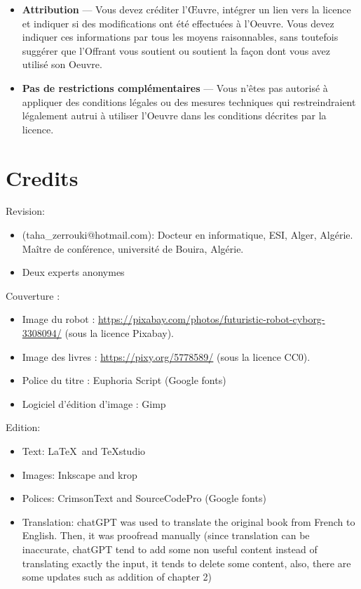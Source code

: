 \documentclass{KBook}
\begin{document}
\begin{tcolorbox}[colback=my-grey,
	colframe=my-grey,  
	center, arc=0pt,outer arc=0pt,
	valign=top, 
	halign=left,
	width=\textwidth]
	\begin{itemize}
		\item[] \textbf{Attribution} — Vous devez créditer l'Œuvre, intégrer un lien vers la licence et indiquer si des modifications ont été effectuées à l'Oeuvre. Vous devez indiquer ces informations par tous les moyens raisonnables, sans toutefois suggérer que l'Offrant vous soutient ou soutient la façon dont vous avez utilisé son Oeuvre. 
		\item[] \textbf{Pas de restrictions complémentaires} — Vous n'êtes pas autorisé à appliquer des conditions légales ou des mesures techniques qui restreindraient légalement autrui à utiliser l'Oeuvre dans les conditions décrites par la licence.
	\end{itemize}
	
\end{tcolorbox}

\chapter*{Credits}

Revision:
\begin{itemize}
	\item {} (taha\_zerrouki@hotmail.com): Docteur en informatique, ESI, Alger, Algérie. Maître de conférence, université de Bouira, Algérie.
	\item Deux experts anonymes 
\end{itemize}

Couverture : 
\begin{itemize}
	\item Image du robot : \url{https://pixabay.com/photos/futuristic-robot-cyborg-3308094/} (sous la licence Pixabay).
	\item Image des livres : \url{https://pixy.org/5778589/} (sous la licence CC0).
	\item Police du titre : Euphoria Script (Google fonts)
	\item Logiciel d'édition d'image : Gimp
\end{itemize}

Edition:
\begin{itemize}
	\item Text: \LaTeX\ and TeXstudio
	\item Images: Inkscape and krop
	\item Polices: CrimsonText and SourceCodePro (Google fonts)
	\item Translation: chatGPT was used to translate the original book from French to English. Then, it was proofread manually (since translation can be inaccurate, chatGPT tend to add some non useful content instead of translating exactly the input, it tends to delete some content, also, there are some updates such as addition of chapter 2)
\end{itemize}
\end{document}
